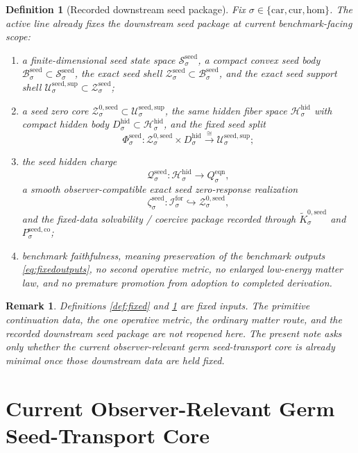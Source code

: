 \documentclass[11pt]{article}
\newcommand{\Car}{\mathrm{car}}
\newcommand{\Cur}{\mathrm{cur}}
\newcommand{\Hom}{\mathrm{hom}}
\newcommand{\ForSpace}[1]{\mathcal I_{#1}^{\mathrm{for}}}
\newcommand{\EqnTarget}[1]{Q_{#1}^{\mathrm{eqn}}}
\newcommand{\HiddenSpace}[1]{\mathcal H_{#1}^{\mathrm{hid}}}
\newcommand{\HiddenBody}[1]{D_{#1}^{\mathrm{hid}}}
\newcommand{\SeedState}[1]{\mathcal S_{#1}^{\mathrm{seed}}}
\newcommand{\SeedBody}[1]{\mathcal B_{#1}^{\mathrm{seed}}}
\newcommand{\SeedShell}[1]{\mathcal Z_{#1}^{\mathrm{seed}}}
\newcommand{\SeedSupportShell}[1]{\mathcal U_{#1}^{\mathrm{seed,sup}}}
\newcommand{\SeedZeroCore}[1]{\mathcal Z_{#1}^{0,\mathrm{seed}}}
\newcommand{\SeedSplit}[1]{\Phi_{#1}^{\mathrm{seed}}}
\newcommand{\SeedCharge}[1]{\mathcal Q_{#1}^{\mathrm{seed}}}
\newcommand{\SeedEmbed}[1]{\zeta_{#1}^{\mathrm{seed}}}
\newcommand{\SeedKernel}[1]{\widetilde K_{#1}^{0,\mathrm{seed}}}
\newcommand{\SeedCoercive}[1]{P_{#1}^{\mathrm{seed,co}}}
\newtheorem{definition}{Definition}
\newtheorem{remark}{Remark}
\begin{document}
\begin{definition}[Recorded downstream seed package]
\label{def:seed}
Fix \(\sigma\in\{\Car,\Cur,\Hom\}\). The active line already fixes the downstream seed package at current benchmark-facing scope:
\begin{enumerate}
    \item a finite-dimensional seed state space \(\SeedState{\sigma}\), a compact convex seed body \(\SeedBody{\sigma}\subset\SeedState{\sigma}\), the exact seed shell \(\SeedShell{\sigma}\subset\SeedBody{\sigma}\), and the exact seed support shell \(\SeedSupportShell{\sigma}\subset\SeedShell{\sigma}\);
    \item a seed zero core \(\SeedZeroCore{\sigma}\subset\SeedSupportShell{\sigma}\), the same hidden fiber space \(\HiddenSpace{\sigma}\) with compact hidden body \(\HiddenBody{\sigma}\subset\HiddenSpace{\sigma}\), and the fixed seed split
    \[
    \SeedSplit{\sigma}:
    \SeedZeroCore{\sigma}\times\HiddenBody{\sigma}
    \xrightarrow{\cong}
    \SeedSupportShell{\sigma};
    \]
    \item the seed hidden charge
    \[
    \SeedCharge{\sigma}:\HiddenSpace{\sigma}\to\EqnTarget{\sigma},
    \]
    a smooth observer-compatible exact seed zero-response realization
    \[
    \SeedEmbed{\sigma}:\ForSpace{\sigma}\hookrightarrow\SeedZeroCore{\sigma},
    \]
    and the fixed-data solvability / coercive package recorded through \(\SeedKernel{\sigma}\) and \(\SeedCoercive{\sigma}\);
    \item benchmark faithfulness, meaning preservation of the benchmark outputs \eqref{eq:fixedoutputs}, no second operative metric, no enlarged low-energy matter law, and no premature promotion from adoption to completed derivation.
\end{enumerate}
\end{definition}

\begin{remark}
Definitions \ref{def:fixed} and \ref{def:seed} are fixed inputs. The primitive continuation data, the one operative metric, the ordinary matter route, and the recorded downstream seed package are not reopened here. The present note asks only whether the current observer-relevant germ seed-transport core is already minimal once those downstream data are held fixed.
\end{remark}

\section{Current Observer-Relevant Germ Seed-Transport Core}
\end{document}
